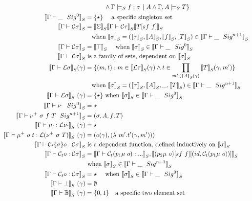 \begin{align*}
      & \quad \quad \quad \land  {\goodSealS{\Gamma}{f}{\sigma}{A}}
      \land  {\goodTypeS{\Gamma, A}{T}{i}} 
  \} \\ 
  \denotesS{\goodSig{\Gamma}{\_}{0}} &= \{\star\} \quad \text{ a specific singleton set} \\
  \denotesS{\goodType{\Gamma}{\cC \sigma}{}} &= \denotesS{\Sigma} \denotesS{\goodType{\Gamma}{\cC \tau}{}} \denotesS{T[sf \ f]} \\
  & \quad \text{when } \denotesS{\sigma} = (\denotesS{\tau}, \denotesS{A}, \denotesS{f} , \denotesS{T}) \in \denotesS{\goodSig{\Gamma}{\_}{n+1}} \\
  \denotesS{\goodType{\Gamma}{\cC \sigma}{i}}&= \denotesS{\top}\quad \text{ when } \denotesS{\sigma} \in \denotesS{\goodSig{\Gamma}{\_}{0}} \\
  \denotesS{\goodType{\Gamma}{\cL \sigma}{i}} & \text{ is a family of sets, dependent on } \denotesS{\sigma}  \\
  \denotesS{\goodType{\Gamma}{\cL \sigma}{i}} (\gamma)&= \{(m, t) :  m \in \denotesS{\cL \tau}(\gamma) \land t \in \prod_{m' \in \denotesS{A}(\gamma)}\denotesS{T}(\gamma, m')  \}  \\
  & \quad \text{when } \denotesS{\sigma} = (\denotesS{\tau}, \denotesS{A}, \_, \denotesS{T}) \in \denotesS{\goodSig{\Gamma}{\_}{n+1}} \\
  \denotesS{\goodType{\Gamma}{\cL \sigma}{i}} \ (\gamma)&= \{\star\} \text{ when } \denotesS{\sigma} \in \denotesS{\goodSig{\Gamma}{\_}{0}} \\
  \denotesS{\goodSig{\Gamma}{\nu\cdot}{0}} &= \star \\
  \denotesS{\goodSig{\Gamma}{\nu^+ \ \sigma \ f \ T}{n+1}} &= (\sigma, A, f, T) \\
  \denotesS{\goodTerm{\Gamma}{\mu\cdot}{\cL \nu\cdot} } \ (\gamma) &= \star \\
  \denotesS{\goodTerm{\Gamma}{\mu^+ \ o \ t}{\cL(\nu^+ \ \sigma  \ T)}} \ (\gamma)&= (o(\gamma), (\lambda \ m' . t'(\gamma, m'))) \\
  \denotesS{\goodTerm{\Gamma}{\cCt \{\sigma\} o}{\cC\sigma}} & \text{ is a dependent function, defined inductively on } \denotesS{\sigma} \\
  \denotesS{\goodTerm{\Gamma}{\cCt o}{\cC\sigma}}
  &= \denotesS{\goodTerm{\Gamma}{\cCt (p_1\mu \ o)}{...}}, \denotesS{(p_2\mu \ o)[sf \ f][(id, \cCt (p_1\mu \ o))]} \\
  & \text{ when } \denotesS{\sigma} \in \denotesS{\goodSig{\Gamma}{\_}{n+1}} \\
  \denotesS{\goodTerm{\Gamma}{\cCt o}{\cC\sigma}}
  &= \star \quad \text{ when } \denotesS{\sigma} \in \denotesS{\goodSig{\Gamma}{\_}{0}} \\
  \denotesS{\goodType{\Gamma}{\bot}{i}} \ (\gamma) &= \emptyset \\
  \denotesS{\goodType{\Gamma}{\cB}{i}} \ (\gamma) &= \{0, 1\} \quad \text{a specific two element set} \\
\end{align*}


